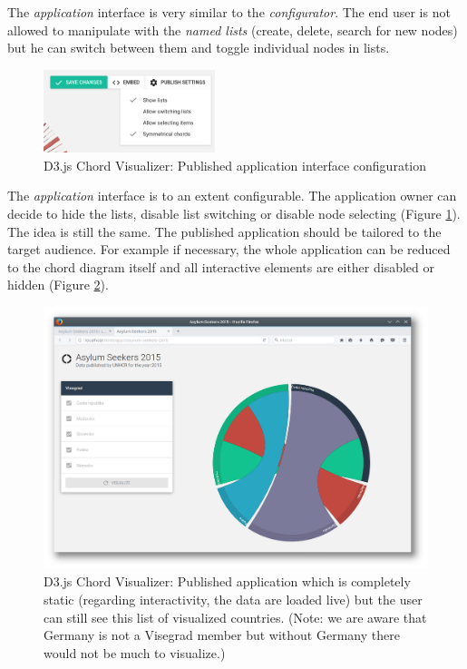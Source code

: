 The \emph{application} interface is very similar to the \emph{configurator}. The end user is not allowed to manipulate with the \emph{named lists} (create, delete, search for new nodes) but he can switch between them and toggle individual nodes in lists. 


\begin{figure}
	\centering
	\includegraphics[width=50mm]{img/06_chord_publish_configuration_interface}
	\caption{D3.js Chord Visualizer: Published application interface configuration}
    \label{fig:chord-publish-configuration-interface}
\end{figure}

The \emph{application} interface is to an extent configurable. The application owner can decide to hide the lists, disable list switching or disable node selecting (Figure \ref{fig:chord-publish-configuration-interface}). The idea is still the same. The published application should be tailored to the target audience. For example if necessary, the whole application can be reduced to the chord diagram itself and all interactive elements are either disabled or hidden (Figure \ref{fig:chord-visegrad-published}).

\begin{figure}
	\centering
	\includegraphics[width=145mm]{img/06_chord_visegrad_published}
	\caption{D3.js Chord Visualizer: Published application which is completely static (regarding interactivity, the data are loaded live) but the user can still see this list of visualized countries. (Note: we are aware that Germany is not a Visegrad member but without Germany there would not be much to visualize.)}
    \label{fig:chord-visegrad-published}
\end{figure}

